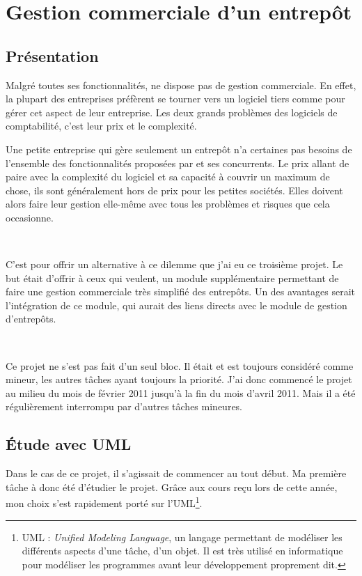 \chapter{Gestion commerciale d'un entrepôt}
\section{Présentation}
Malgré toutes ses fonctionnalités, \integrale{} ne dispose pas de gestion commerciale. En effet, la plupart des entreprises préfèrent se tourner vers un logiciel  tiers comme  pour gérer cet aspect de leur entreprise. Les deux grands problèmes des logiciels de comptabilité, c'est leur prix et le complexité.

Une petite entreprise qui gère seulement un entrepôt n'a certaines pas besoins de l'ensemble des fonctionnalités proposées par  et ses concurrents. Le prix allant de paire avec la complexité du logiciel et sa capacité à couvrir un maximum de chose, ils sont généralement hors de prix pour les petites sociétés. Elles doivent alors faire leur gestion elle-même avec tous les problèmes et risques que cela occasionne.

~

C'est pour offrir un alternative à ce dilemme que j'ai eu ce troisième projet. Le but était d'offrir à ceux qui veulent, un module supplémentaire permettant de faire une gestion commerciale très simplifié des entrepôts. Un des avantages serait l'intégration de ce module, qui aurait des liens directs avec le module de gestion d'entrepôts.

~

Ce projet ne s'est pas fait d'un seul bloc. Il était et est toujours considéré comme mineur, les autres tâches ayant toujours la priorité. J'ai donc commencé le projet au milieu du mois de février 2011 jusqu'à la fin du mois d'avril 2011. Mais il a été régulièrement interrompu par d'autres tâches mineures.

\section{Étude avec UML}
Dans le cas de ce projet, il s'agissait de commencer au tout début. Ma première tâche à donc été d'étudier le projet. Grâce aux cours reçu lors de cette année, mon choix s'est rapidement porté sur l'UML\footnote{UML : \emph{Unified Modeling Language}, un \og langage \fg{} permettant de modéliser les différents aspects d'une tâche, d'un objet. Il est très utilisé en informatique pour modéliser les programmes avant leur développement proprement dit.}.

